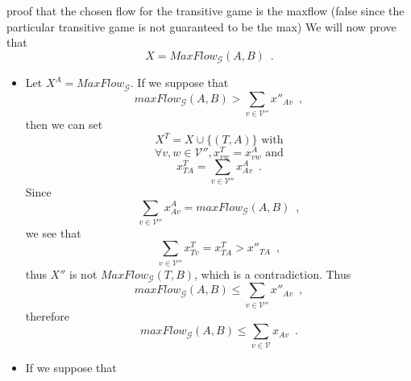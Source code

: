 proof that the chosen flow for the transitive game is the maxflow (false since the particular transitive game is not guaranteed to be the max)
       We will now prove that
       \begin{equation}
          X = MaxFlow_{\mathcal{G}}\left(A, B\right) \enspace.
       \end{equation}
       \begin{itemize}
          \item Let $X^A = MaxFlow_{\mathcal{G}}$. If we suppose that
          \begin{equation}
             maxFlow_{\mathcal{G}}\left(A, B\right) > \sum\limits_{v \in \mathcal{V}''}x''_{Av} \enspace,
          \end{equation}
          then we can set
          \begin{equation}
             X^T = X \cup \{(T, A)\} \mbox{ with}
          \end{equation}
          \begin{equation}
             \forall v, w \in \mathcal{V}'', x^T_{vw} = x^A_{vw} \mbox{ and}
          \end{equation}
          \begin{equation}
             x^T_{TA} = \sum\limits_{v \in \mathcal{V}''}x^A_{Av} \enspace.
          \end{equation}
          Since
          \begin{equation}
             \sum\limits_{v \in \mathcal{V}''}x^A_{Av} = maxFlow_{\mathcal{G}}\left(A, B\right) \enspace,
          \end{equation}
          we see that
          \begin{equation}
             \sum\limits_{v \in \mathcal{V}''}x^T_{Tv} = x^T_{TA} > x''_{TA} \enspace,
          \end{equation}
          thus $X''$ is not $MaxFlow_{\mathcal{G}}\left(T, B\right)$, which is a contradiction. Thus
          \begin{equation}
             maxFlow_{\mathcal{G}}\left(A, B\right) \leq \sum\limits_{v \in \mathcal{V}''}x''_{Av} \enspace,
          \end{equation}
          therefore
          \begin{equation}
             maxFlow_{\mathcal{G}}\left(A, B\right) \leq \sum\limits_{v \in \mathcal{V}}x_{Av} \enspace.
          \end{equation}
          \item If we suppose that
          \begin{equation}

\end{equation}
\end{itemize}
